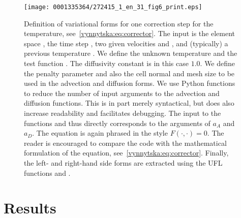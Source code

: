 \begin{figure}[!t]
\texttt{[image: 0001335364/272415\_1\_en\_31\_fig6\_print.eps]}
    \caption{Definition of variational forms for one correction step
      for the temperature, see~\eqref{vynnytska:eq:corrector}. The
      input is the element space , the time step , two given velocities
       and , and (typically) a previous temperature
      . We define the unknown temperature  and the test
      function . The diffusivity constant  is in
      this case $1.0$. We define the penalty parameter 
      and also the cell normal  and mesh size  to be
      used in the advection and diffusion forms.
%
      We use Python functions to reduce the number of input
      arguments to the advection and diffusion \hbox{functions}. This is in
      part merely syntactical, but does also increase readability and
      facilitates debugging. The input to the functions 
      and  thus directly corresponds to the arguments of
      $a_A$ and $a_D$.
%
      The equation is again phrased in the style $F(\cdot, \cdot) =
      0$. The reader is encouraged to compare the code with the
      mathematical formulation of the equation,
      see~\eqref{vynnytska:eq:corrector}. Finally, the left- and
      right-hand side forms are extracted using the UFL
      functions  and .}
  \label{vynnytska:fig:temperaturecorrection}
\end{figure}


\section{Results}
\label{vynnytska:sec:results}

